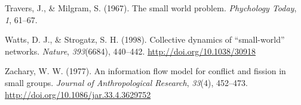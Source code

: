 \documentclass[12pt,twoside]{amherstthesis}
\begin{document}
  \hypertarget{ref-travers1967small}{}
  Travers, J., \& Milgram, S. (1967). The small world problem.
  \emph{Phychology Today}, \emph{1}, 61--67.
  
  \hypertarget{ref-watts_collective_1998}{}
  Watts, D. J., \& Strogatz, S. H. (1998). Collective dynamics of
  ``small-world'' networks. \emph{Nature}, \emph{393}(6684), 440--442.
  \url{http://doi.org/10.1038/30918}
  
  \hypertarget{ref-zachskarateclub}{}
  Zachary, W. W. (1977). An information flow model for conflict and
  fission in small groups. \emph{Journal of Anthropological Research},
  \emph{33}(4), 452--473. \url{http://doi.org/10.1086/jar.33.4.3629752}


\end{document}
